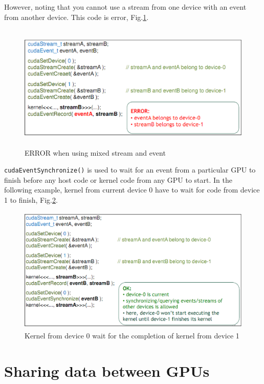 However, noting that you cannot use a stream from one device with an event from
another device. This code is error, Fig.\ref{fig:CUDA4_stream_event}.

\begin{figure}[hbt]
  \centerline{\includegraphics[height=6cm,
    angle=0]{./images/CUDA4_ex_wrongstream_event.eps}}
  \caption{ERROR when using mixed stream and event}
  \label{fig:CUDA4_stream_event}
\end{figure}

\verb!cudaEventSynchronize()! is used to wait for an event from a particular
GPU to finish before any host code or kernel code from any GPU to start. In the
following example, kernel from current device 0 have to wait for code from
device 1 to finish, Fig.\ref{fig:CUDA4_stream_wait}.

\begin{figure}[hbt]
  \centerline{\includegraphics[height=6cm,
    angle=0]{./images/CUDA4_ex_stream_wait.eps}}
  \caption{Kernel from device 0 wait for the completion of kernel from device 1}
  \label{fig:CUDA4_stream_wait}
\end{figure}

\section{Sharing data between GPUs}
\label{sec:GPUs_share-data}

